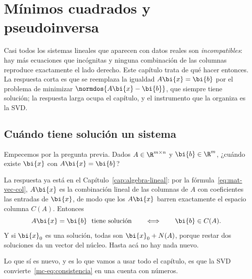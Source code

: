 
\chapter{Mínimos cuadrados y pseudoinversa}\label{cap:minimos}

Casi todos los sistemas lineales que aparecen con datos reales son
\emph{incompatibles}: hay más ecuaciones que incógnitas y ninguna combinación
de las columnas reproduce exactamente el lado derecho. Este capítulo trata de
qué hacer entonces. La respuesta corta es que se reemplaza la igualdad
$A\bi{x}=\bi{b}$ por el problema de minimizar $\normdos{A\bi{x}-\bi{b}}$, que
siempre tiene solución; la respuesta larga ocupa el capítulo, y el
instrumento que la organiza es la SVD.

\section{Cuándo tiene solución un sistema}\label{mc-sec:consistencia}

Empecemos por la pregunta previa. Dados $A\in\R^{m\times n}$ y
$\bi{b}\in\R^m$, ¿cuándo existe $\bi{x}$ con $A\bi{x}=\bi{b}$?

La respuesta ya está en el Capítulo~\ref{cap:algebra-lineal}: por la
fórmula~\eqref{eq:mat-vec-col}, $A\bi{x}$ es la combinación lineal de las
columnas de $A$ con coeficientes las entradas de $\bi{x}$, de modo que los
$A\bi{x}$ barren exactamente el espacio columna $C(A)$. Entonces
\begin{equation}\label{mc-eq:consistencia}
A\bi{x}=\bi{b}\ \text{ tiene solución}\qquad\Longleftrightarrow\qquad
\bi{b}\in C(A).
\end{equation}
Y si $\bi{x}_0$ es una solución, todas son $\bi{x}_0+N(A)$, porque restar dos
soluciones da un vector del núcleo. Hasta acá no hay nada nuevo.

Lo que sí es nuevo, y es lo que vamos a usar todo el capítulo, es que la SVD
convierte~\eqref{mc-eq:consistencia} en una cuenta con números.

